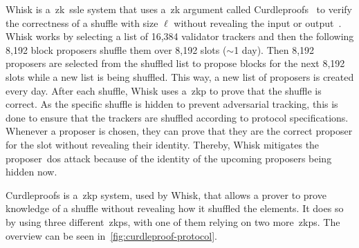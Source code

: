 Whisk is a~\gls{zk}~\gls{ssle} system that uses a~\gls{zk} argument called Curdleproofs~\cite{Curdleproofs} to verify the correctness of a shuffle with size $\ell$ without revealing the input or output~\cite{10.1145/3419614.3423258}.
Whisk works by selecting a list of 16,384 validator trackers and then the following 8,192 block proposers shuffle them over 8,192 slots ($\sim$1 day).
Then 8,192 proposers are selected from the shuffled list to propose blocks for the next 8,192 slots while a new list is being shuffled.
This way, a new list of proposers is created every day.
After each shuffle, Whisk uses a~\gls{zkp} to prove that the shuffle is correct.
As the specific shuffle is hidden to prevent adversarial tracking, this is done to ensure that the trackers are shuffled according to protocol specifications.
Whenever a proposer is chosen, they can prove that they are the correct proposer for the slot without revealing their identity.
Thereby, Whisk mitigates the proposer~\gls{dos} attack because of the identity of the upcoming proposers being hidden now.

Curdleproofs is a~\gls{zkp} system, used by Whisk, that allows a prover to prove knowledge of a shuffle without revealing how it shuffled the elements.
It does so by using three different~\glspl{zkp}, with one of them relying on two more~\glspl{zkp}.
The overview can be seen in~\autoref{fig:curdleproof-protocol}.


